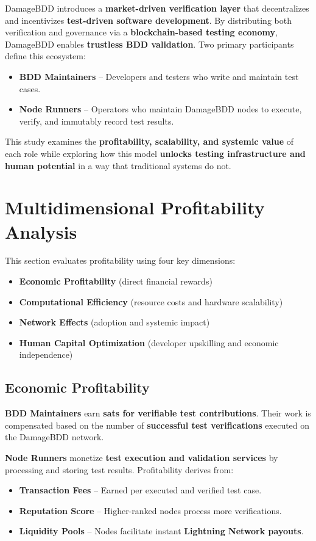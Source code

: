 \documentclass[a4paper,12pt]{article}
\begin{document}
DamageBDD introduces a \textbf{market-driven verification layer} that decentralizes and incentivizes \textbf{test-driven software development}. By distributing both verification and governance via a \textbf{blockchain-based testing economy}, DamageBDD enables \textbf{trustless BDD validation}. Two primary participants define this ecosystem:
\begin{itemize}
    \item \textbf{BDD Maintainers} – Developers and testers who write and maintain test cases.
    \item \textbf{Node Runners} – Operators who maintain DamageBDD nodes to execute, verify, and immutably record test results.
\end{itemize}

This study examines the \textbf{profitability, scalability, and systemic value} of each role while exploring how this model \textbf{unlocks testing infrastructure and human potential} in a way that traditional systems do not.

\section{Multidimensional Profitability Analysis}
This section evaluates profitability using four key dimensions:
\begin{itemize}
    \item \textbf{Economic Profitability} (direct financial rewards)
    \item \textbf{Computational Efficiency} (resource costs and hardware scalability)
    \item \textbf{Network Effects} (adoption and systemic impact)
    \item \textbf{Human Capital Optimization} (developer upskilling and economic independence)
\end{itemize}

\subsection{Economic Profitability}
\textbf{BDD Maintainers} earn \textbf{sats for verifiable test contributions}. Their work is compensated based on the number of \textbf{successful test verifications} executed on the DamageBDD network.

\textbf{Node Runners} monetize \textbf{test execution and validation services} by processing and storing test results. Profitability derives from:
\begin{itemize}
    \item \textbf{Transaction Fees} – Earned per executed and verified test case.
    \item \textbf{Reputation Score} – Higher-ranked nodes process more verifications.
    \item \textbf{Liquidity Pools} – Nodes facilitate instant \textbf{Lightning Network payouts}.
\end{itemize}
\end{document}
